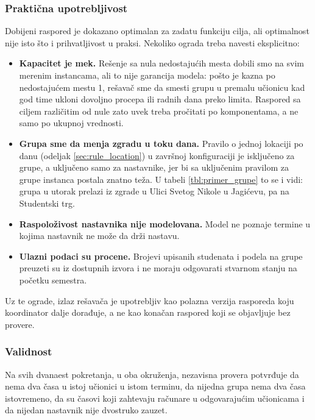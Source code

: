 \documentclass[12pt,oneside]{memoir}
\begin{document}
\subsubsection{Praktična upotrebljivost}

Dobijeni raspored je dokazano optimalan za zadatu funkciju cilja, ali
optimalnost nije isto što i prihvatljivost u praksi. Nekoliko ograda
treba navesti eksplicitno:

\begin{itemize}
\item \textbf{Kapacitet je mek.} Rešenje sa nula nedostajućih mesta
  dobili smo na svim merenim instancama, ali to nije garancija modela:
  pošto je kazna po nedostajućem mestu 1, rešavač sme da smesti grupu u
  premalu učionicu kad god time ukloni dovoljno procepa ili radnih dana
  preko limita. Raspored sa ciljem različitim od nule zato uvek treba
  pročitati po komponentama, a ne samo po ukupnoj vrednosti.
\item \textbf{Grupa sme da menja zgradu u toku dana.} Pravilo o jednoj
  lokaciji po danu (odeljak \ref{sec:rule_location}) u završnoj
  konfiguraciji je isključeno za grupe, a uključeno samo za nastavnike,
  jer bi sa uključenim pravilom za grupe instanca postala znatno teža.
  U tabeli \ref{tbl:primer_grupe} to se i vidi: grupa u utorak prelazi
  iz zgrade u Ulici Svetog Nikole u Jagićevu, pa na Studentski trg.
\item \textbf{Raspoloživost nastavnika nije modelovana.} Model ne
  poznaje termine u kojima nastavnik ne može da drži nastavu.
\item \textbf{Ulazni podaci su procene.} Brojevi upisanih studenata i
  podela na grupe preuzeti su iz dostupnih izvora i ne moraju odgovarati
  stvarnom stanju na početku semestra.
\end{itemize}

Uz te ograde, izlaz rešavača je upotrebljiv kao polazna verzija
rasporeda koju koordinator dalje dorađuje, a ne kao konačan raspored
koji se objavljuje bez provere.

\subsubsection{Validnost}

Na svih dvanaest pokretanja, u oba okruženja, nezavisna provera potvrđuje
da nema dva časa u istoj učionici u istom terminu, da nijedna grupa nema
dva časa istovremeno, da su časovi koji zahtevaju računare u
odgovarajućim učionicama i da nijedan nastavnik nije dvostruko zauzet.
\end{document}

